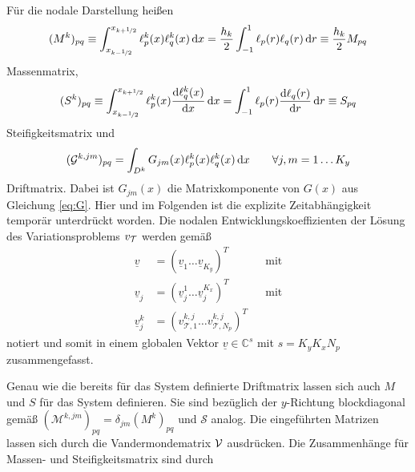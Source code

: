\begin{definition} \label{def:matrizen}
  Für die nodale Darstellung heißen
  \begin{equation*}
    (M^k)_{pq} \equiv \int_{x_{k-\nicefrac{1}{2}}}^{x_{k+\nicefrac{1}{2}}} \ell_p^k(x) \ell_q^k(x) \mathop{}\!\mathrm{d} x = \frac{h_k}{2}\int_{-1}^1 \ell_p(r) \ell_q(r) \mathop{}\!\mathrm{d} r \equiv \frac{h_k}{2} M_{pq}
    \label{eq:Mmatrix}
  \end{equation*}
  Massenmatrix,
  \begin{equation*}
    (S^k)_{pq} \equiv \int_{x_{k-\nicefrac{1}{2}}}^{x_{k+\nicefrac{1}{2}}} \ell_p^k(x) \frac{\mathrm{d}\ell_q^k(x)}{\mathrm{d}x} \mathop{}\!\mathrm{d} x = \int_{-1}^1 \ell_p(r) \frac{\mathrm{d}\ell_q(r)}{\mathrm{d}r}  \mathop{}\!\mathrm{d} r \equiv S_{pq}
    \label{eq:Smatrix}
  \end{equation*}
  Steifigkeitsmatrix und
  \begin{equation*}
    (\drift^{k,jm})_{pq} = \int_{D^k} G_{jm}(x) \ell_p^k(x) \ell_q^k(x) \diff x \qquad \forall j,m=1\dots K_y %
  \end{equation*}
  Driftmatrix. Dabei ist $G_{jm}(x)$ die Matrixkomponente von $G(x)$ aus Gleichung \eqref{eq:G}. Hier und im Folgenden ist die explizite Zeitabhängigkeit temporär unterdrückt worden. Die nodalen Entwicklungskoeffizienten der Lösung des Variationsproblems $v_{\mathcal{T}}$ werden gemäß
  \begin{equation*}
    \begin{aligned}
      \underline{v} &= (\underline{v}_1 \dots \underline{v}_{K_y})^T        &  &\text{mit} \\
      \underline{v}_j &= (\underline{v}_j^1 \dots \underline{v}_j^{K_x})^T  &  &\text{mit} \\
      \underline{v}_j^k &= (v_{\mathcal{T},1}^{k,j} \dots v_{\mathcal{T},N_p}^{k,j})^T
    \end{aligned}
  \end{equation*}
  notiert und somit in einem globalen Vektor $\underline{v} \in \mathbb{C}^{s}$ mit $s=K_y K_x N_p$ zusammengefasst.
\end{definition}
Genau wie die bereits für das System definierte Driftmatrix lassen sich auch $M$ und $S$ für das System definieren. Sie sind bezüglich der $y$-Richtung blockdiagonal gemäß $(\mathcal{M}^{k,jm})_{pq} = \delta_{jm}(M^k)_{pq}$ und $\mathcal{S}$ analog.
Die eingeführten Matrizen lassen sich durch die Vandermondematrix $\mathcal{V}$ ausdrücken. Die Zusammenhänge für Massen- und Steifigkeitsmatrix sind durch
